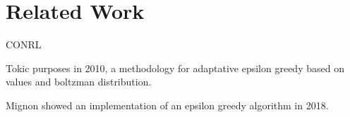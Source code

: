 
\section{Related Work}
\label{sec:related}


\ac{CONRL}~\cite{gueriau19}

Tokic purposes in 2010, a methodology for adaptative epsilon greedy based on values and boltzman distribution.~\cite{tokic2010}

Mignon showed an implementation of an epsilon greedy algorithm in 2018.~\cite{mignon2017adaptive}



\endinput

